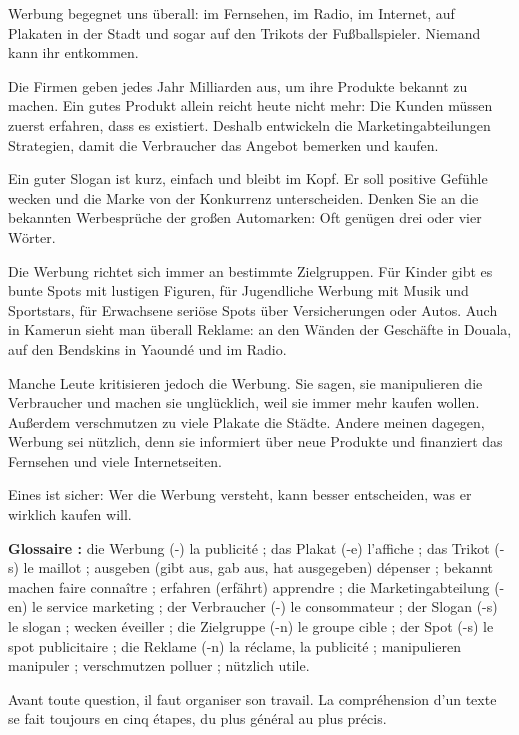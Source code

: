 \documentclass[11pt]{article}
\newcounter{popsec}
\newcounter{popsub}
\newcommand{\courssub}[1]{%
  \stepcounter{popsub}%
  \par\vspace{9pt}\noindent{\popxbold\fontsize{11.5}{13}\selectfont\color{popink}{\color{poporange}\thepopsec.\thepopsub}\hspace{6pt}#1}\par\nopagebreak\vspace{4pt}
}
\begin{document}
\begin{textebox}
Werbung begegnet uns überall: im Fernsehen, im Radio, im Internet, auf Plakaten in der Stadt und sogar auf den Trikots der Fußballspieler. Niemand kann ihr entkommen.

Die Firmen geben jedes Jahr Milliarden aus, um ihre Produkte bekannt zu machen. Ein gutes Produkt allein reicht heute nicht mehr: Die Kunden müssen zuerst erfahren, dass es existiert. Deshalb entwickeln die Marketingabteilungen Strategien, damit die Verbraucher das Angebot bemerken und kaufen.

Ein guter Slogan ist kurz, einfach und bleibt im Kopf. Er soll positive Gefühle wecken und die Marke von der Konkurrenz unterscheiden. Denken Sie an die bekannten Werbesprüche der großen Automarken: Oft genügen drei oder vier Wörter.

Die Werbung richtet sich immer an bestimmte Zielgruppen. Für Kinder gibt es bunte Spots mit lustigen Figuren, für Jugendliche Werbung mit Musik und Sportstars, für Erwachsene seriöse Spots über Versicherungen oder Autos. Auch in Kamerun sieht man überall Reklame: an den Wänden der Geschäfte in Douala, auf den Bendskins in Yaoundé und im Radio.

Manche Leute kritisieren jedoch die Werbung. Sie sagen, sie manipulieren die Verbraucher und machen sie unglücklich, weil sie immer mehr kaufen wollen. Außerdem verschmutzen zu viele Plakate die Städte. Andere meinen dagegen, Werbung sei nützlich, denn sie informiert über neue Produkte und finanziert das Fernsehen und viele Internetseiten.

Eines ist sicher: Wer die Werbung versteht, kann besser entscheiden, was er wirklich kaufen will.
\end{textebox}

\textbf{Glossaire :} die Werbung (-) la publicité ; das Plakat (-e) l'affiche ; das Trikot (-s) le maillot ; ausgeben (gibt aus, gab aus, hat ausgegeben) dépenser ; bekannt machen faire connaître ; erfahren (erfährt) apprendre ; die Marketingabteilung (-en) le service marketing ; der Verbraucher (-) le consommateur ; der Slogan (-s) le slogan ; wecken éveiller ; die Zielgruppe (-n) le groupe cible ; der Spot (-s) le spot publicitaire ; die Reklame (-n) la réclame, la publicité ; manipulieren manipuler ; verschmutzen polluer ; nützlich utile.

\courssub{La méthode générale de compréhension}

Avant toute question, il faut organiser son travail. La compréhension d'un texte se fait toujours en cinq étapes, du plus général au plus précis.
\end{document}
